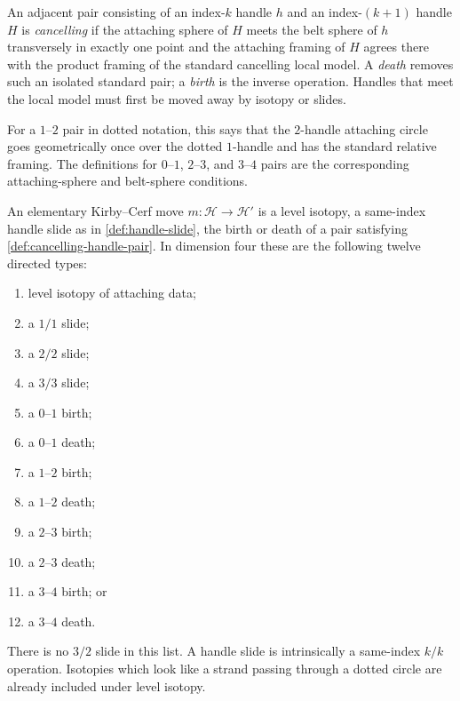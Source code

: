 \begin{definition}
\label{def:cancelling-handle-pair}
An adjacent pair consisting of an index-\(k\) handle \(h\) and an
index-\((k+1)\) handle \(H\) is \emph{cancelling} if the attaching sphere of
\(H\) meets the belt sphere of \(h\) transversely in exactly one point and
the attaching framing of \(H\) agrees there with the product framing of the
standard cancelling local model.  A \emph{death} removes such an isolated
standard pair; a \emph{birth} is the inverse operation.  Handles that meet
the local model must first be moved away by isotopy or slides.

For a \(1\)--\(2\) pair in dotted notation, this says that the \(2\)-handle
attaching circle goes geometrically once over the dotted \(1\)-handle and
has the standard relative framing.  The definitions for \(0\)--\(1\),
\(2\)--\(3\), and \(3\)--\(4\) pairs are the corresponding attaching-sphere
and belt-sphere conditions.
\end{definition}

\begin{definition}
\label{def:kirby-move}
An elementary Kirby--Cerf move \(m\colon\mathcal H\to\mathcal H'\) is a
level isotopy, a same-index handle slide as in \cref{def:handle-slide}, the
birth or death of a pair satisfying \cref{def:cancelling-handle-pair}.  In
dimension four these are the following twelve directed types:
\begin{enumerate}[label=(\roman*),ref=\roman*]
  \item\label{move:framed-isotopy} level isotopy of attaching data;
  \item\label{move:one-over-one} a \(1/1\) slide;
  \item\label{move:two-over-two} a \(2/2\) slide;
  \item\label{move:three-over-three} a \(3/3\) slide;
  \item a \(0\)--\(1\) birth;
  \item a \(0\)--\(1\) death;
  \item\label{move:one-two-birth} a \(1\)--\(2\) birth;
  \item\label{move:one-two-death} a \(1\)--\(2\) death;
  \item\label{move:two-three-birth} a \(2\)--\(3\) birth;
  \item\label{move:two-three-death} a \(2\)--\(3\) death;
  \item a \(3\)--\(4\) birth; or
  \item a \(3\)--\(4\) death.
\end{enumerate}
There is no \(3/2\) slide in this list.  A handle slide is intrinsically a
same-index \(k/k\) operation.  Isotopies which look like a strand passing
through a dotted circle are already included under level isotopy.
\end{definition}

